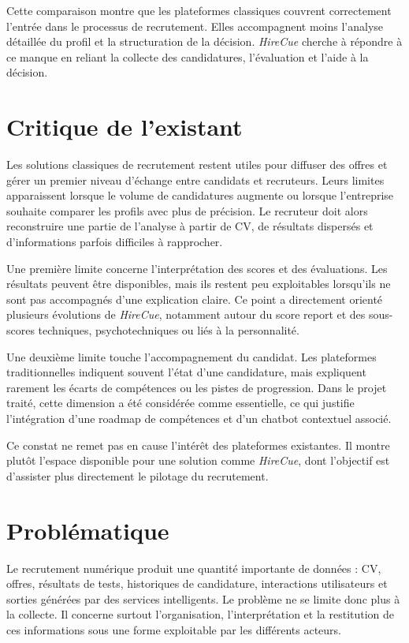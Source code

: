 Cette comparaison montre que les plateformes classiques couvrent correctement l'entrée dans le processus de recrutement. Elles accompagnent moins l'analyse détaillée du profil et la structuration de la décision. \textit{HireCue} cherche à répondre à ce manque en reliant la collecte des candidatures, l'évaluation et l'aide à la décision.

\section{Critique de l'existant}

Les solutions classiques de recrutement restent utiles pour diffuser des offres et gérer un premier niveau d'échange entre candidats et recruteurs. Leurs limites apparaissent lorsque le volume de candidatures augmente ou lorsque l'entreprise souhaite comparer les profils avec plus de précision. Le recruteur doit alors reconstruire une partie de l'analyse à partir de CV, de résultats dispersés et d'informations parfois difficiles à rapprocher.

Une première limite concerne l'interprétation des scores et des évaluations. Les résultats peuvent être disponibles, mais ils restent peu exploitables lorsqu'ils ne sont pas accompagnés d'une explication claire. Ce point a directement orienté plusieurs évolutions de \textit{HireCue}, notamment autour du score report et des sous-scores techniques, psychotechniques ou liés à la personnalité.

Une deuxième limite touche l'accompagnement du candidat. Les plateformes traditionnelles indiquent souvent l'état d'une candidature, mais expliquent rarement les écarts de compétences ou les pistes de progression. Dans le projet traité, cette dimension a été considérée comme essentielle, ce qui justifie l'intégration d'une roadmap de compétences et d'un chatbot contextuel associé.

Ce constat ne remet pas en cause l'intérêt des plateformes existantes. Il montre plutôt l'espace disponible pour une solution comme \textit{HireCue}, dont l'objectif est d'assister plus directement le pilotage du recrutement.

\section{Problématique}

Le recrutement numérique produit une quantité importante de données : CV, offres, résultats de tests, historiques de candidature, interactions utilisateurs et sorties générées par des services intelligents. Le problème ne se limite donc plus à la collecte. Il concerne surtout l'organisation, l'interprétation et la restitution de ces informations sous une forme exploitable par les différents acteurs.


